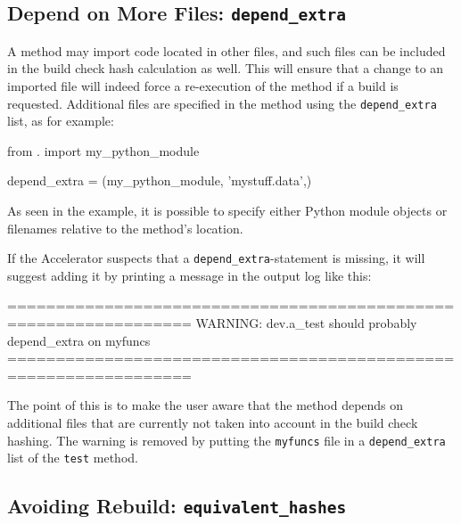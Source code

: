 \subsection{Depend on More Files:  \texttt{depend\_extra}}
A method may import code located in other files, and such files can be
included in the build check hash calculation as well.  This will
ensure that a change to an imported file will indeed force a
re-execution of the method if a build is requested.  Additional files
are specified in the method using the \texttt{depend\_extra} list, as
for example:
\begin{python}
from . import my_python_module

depend_extra = (my_python_module, 'mystuff.data',)
\end{python}
As seen in the example, it is possible to specify either Python module
objects or filenames relative to the method's location.

If the Accelerator suspects that a \texttt{depend\_extra}-statement is
missing, it will suggest adding it by printing a message in the output
log like this:
\begin{shelloutput}
=================================================================
WARNING: dev.a_test should probably depend_extra on myfuncs
=================================================================
\end{shelloutput}
\noindent The point of this is to make the user aware that the method
depends on additional files that are currently not taken into account
in the build check hashing.  The warning is removed by putting the
\texttt{myfuncs} file in a \texttt{depend\_extra} list of the
\texttt{test} method.


\subsection{Avoiding Rebuild: \texttt{equivalent\_hashes}}
\label{sec:equivalent_hashes}

